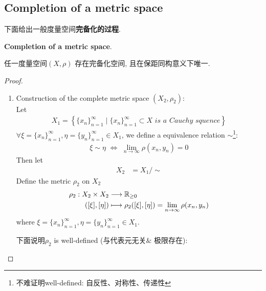 \newpage

\subsection{Completion of a metric space}
	下面给出一般度量空间\textbf{完备化的过程}.
	\begin{thm}\label{thm 1.2.2}
		\textbf{Completion of a metric space}. 
		\begin{center}
			任一度量空间$(X , \rho)$ 存在完备化空间, 且在保距同构意义下唯一.
		\end{center}
		
		\vspace{4em}
		\begin{proof}
			\begin{enumerate}
				\item Construction of the complete metric space $(X_2 , \rho_2)$: \\
				Let
				\begin{align}
					X_1 = \left\{ \{ x_n \}_{n = 1}^{\infty} \mid \{ x_n \}_{n = 1}^{\infty} \subset X \,\, is \,\, a \,\, Cauchy \,\, squence \right\}
				\end{align}
				$\forall \xi = \{ x_n \}_{n = 1}^{\infty} , \eta = \{ y_n \}_{n = 1}^{\infty} \in X_1$, we define a equivalence relation $\sim$\footnote{不难证明well-defined: 自反性、对称性、传递性}:
				\begin{align}
					\xi \sim \eta \,\, \Leftrightarrow \,\, \lim_{n \to \infty}{\rho(x_n , y_n)} = 0
				\end{align}
				Then let
				\begin{align}
					X_2 &= X_1 / \sim 
				\end{align}
				Define the metric $\rho_2$ on $X_2$
				\begin{align}
					\rho_2 : X_2 \times X_2 &\longrightarrow \mathbb{R}_{\geq 0} \\
					([\xi] , [\eta]) &\longmapsto \rho_2([\xi] , [\eta]) = \lim_{n \to \infty}{\rho(x_n , y_n)}
				\end{align}
				where $\xi = \{ x_n \}_{n = 1}^{\infty} , \eta = \{ y_n \}_{n = 1}^{\infty} \in X_1$. 
				
				\vspace{1em}
				下面说明$\rho_2$ is well-defined (与代表元无关$\&$ 极限存在): 
				

\end{enumerate}
\end{proof}
\end{thm}
